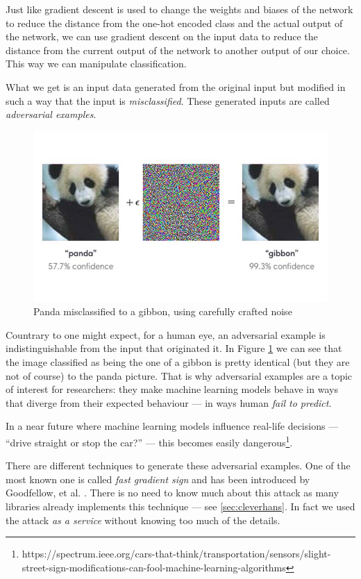 Just like gradient descent is used to change the weights and biases of
the network to reduce the distance from the one-hot encoded class and
the actual output of the network, we can use gradient descent on the
input data to reduce the distance from the current output of the network to
another output of our choice. This way we can manipulate classification.

What we get is an input data generated from the original input but
modified in such a way that the input is \emph{misclassified}. These
generated inputs are called \emph{adversarial examples}.

\begin{figure}
  \centering
  \includegraphics[width=0.75\linewidth]{Images/panda-gibbon.jpg}
  \caption{Panda misclassified to a gibbon, using carefully crafted
    noise}
  \label{fig:panda-gibbon}
\end{figure}

Countrary to one might expect, for a human eye, an adversarial example
is indistinguishable from the input that originated it. In Figure
\ref{fig:panda-gibbon} we can see that the image classified as being
the one of a gibbon is pretty identical (but they are not of course) to
the panda picture. That is why adversarial examples are a topic of
interest for researchers: they make machine learning models behave in
ways that diverge from their expected behaviour --- in ways human
\emph{fail to predict}.

In a near future where machine learning models influence real-life
decisions --- ``drive straight or stop the car?'' --- this becomes
easily dangerous\footnote{https://spectrum.ieee.org/cars-that-think/transportation/sensors/slight-street-sign-modifications-can-fool-machine-learning-algorithms}.

There are different techniques to generate these adversarial examples.
One of the most known one is called \emph{fast gradient sign} and has been
introduced by Goodfellow, et al. \cite{goodfellow6572explaining}.
There is no need to know much about this attack as many libraries
already implements this technique --- see \ref{sec:cleverhans}. In fact
we used the attack \emph{as a service} without knowing too much of the
details.

